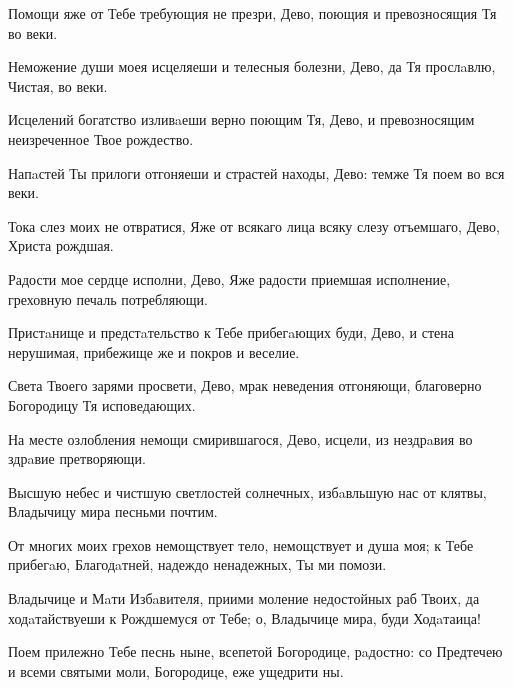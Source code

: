 \begin{mymulticols}
Помощи яже от Тебе требующия не презри, Дево, поющия и превозносящия Тя во веки.


Неможение души моея исцеляеши и телесныя болезни, Дево, да Тя прослaвлю, Чистая, во веки.

\slava

Исцелений богатство изливaеши верно поющим Тя, Дево, и превозносящим неизреченное Твое рождество.

\inyne

Напaстей Ты прилоги отгоняеши и страстей находы, Дево: темже Тя поем во вся веки.




Тока слез моих не отвратися, Яже от всякаго лица всяку слезу отъемшаго, Дево, Христа рождшая.


Радости мое сердце исполни, Дево, Яже радости приемшая исполнение, греховную печаль потребляющи.


Пристaнище и предстaтельство к Тебе прибегaющих буди, Дево, и стена нерушимая, прибежище же и покров и веселие.

\slava

Света Твоего зарями просвети, Дево, мрак неведения отгоняющи, благоверно Богородицу Тя исповедающих.

\inyne

На месте озлобления немощи смирившагося, Дево, исцели, из нездрaвия во здрaвие претворяющи.


Высшую небес и чистшую светлостей солнечных, избaвльшую нас от клятвы, Владычицу мира песньми почтим.

От многих моих грехов немощствует тело, немощствует и душа моя; к Тебе прибегaю, Благодaтней, надеждо ненадежных, Ты ми помози.

Владычице и Мaти Избaвителя, приими моление недостойных раб Твоих, да ходaтайствуеши к Рождшемуся от Тебе; о, Владычице мира, буди Ходaтаица!

Поем прилежно Тебе песнь ныне, всепетой Богородице, рaдостно: со Предтечею и всеми святыми моли, Богородице, еже ущедрити ны.


\end{mymulticols}
